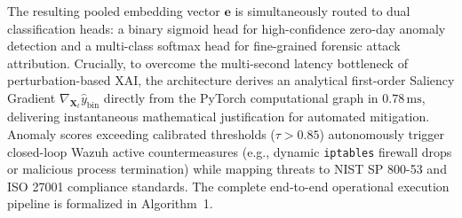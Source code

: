 \documentclass[11pt,a4paper]{article}
\begin{document}
The resulting pooled embedding vector $\mathbf{e}$ is simultaneously routed to dual classification heads: a binary sigmoid head for high-confidence zero-day anomaly detection and a multi-class softmax head for fine-grained forensic attack attribution. Crucially, to overcome the multi-second latency bottleneck of perturbation-based XAI, the architecture derives an analytical first-order Saliency Gradient $\nabla_{\mathbf{X}_t} \hat{y}_{\text{bin}}$ directly from the PyTorch computational graph in $0.78\,\text{ms}$, delivering instantaneous mathematical justification for automated mitigation. Anomaly scores exceeding calibrated thresholds ($\tau > 0.85$) autonomously trigger closed-loop Wazuh active countermeasures (e.g., dynamic \texttt{iptables} firewall drops or malicious process termination) while mapping threats to NIST SP 800-53 and ISO 27001 compliance standards. The complete end-to-end operational execution pipeline is formalized in Algorithm~1.
\end{document}
